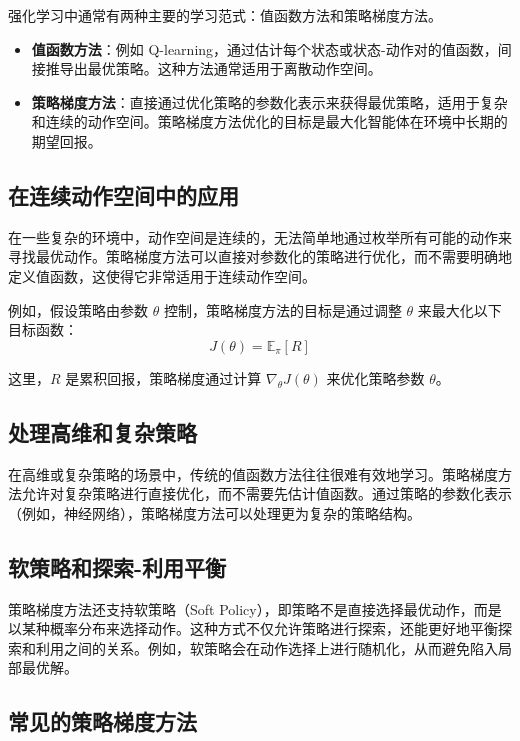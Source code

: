 \documentclass[twocolumn, 10pt]{article} %
\theoremstyle{remark}
\begin{document}
强化学习中通常有两种主要的学习范式：值函数方法和策略梯度方法。

\begin{itemize}
    \item \textbf{值函数方法}：例如 Q-learning，通过估计每个状态或状态-动作对的值函数，间接推导出最优策略。这种方法通常适用于离散动作空间。
    \item \textbf{策略梯度方法}：直接通过优化策略的参数化表示来获得最优策略，适用于复杂和连续的动作空间。策略梯度方法优化的目标是最大化智能体在环境中长期的期望回报。
\end{itemize}

\subsection{在连续动作空间中的应用}

在一些复杂的环境中，动作空间是连续的，无法简单地通过枚举所有可能的动作来寻找最优动作。策略梯度方法可以直接对参数化的策略进行优化，而不需要明确地定义值函数，这使得它非常适用于连续动作空间。

例如，假设策略由参数 \( \theta \) 控制，策略梯度方法的目标是通过调整 \( \theta \) 来最大化以下目标函数：
\[
J(\theta) = \mathbb{E}_\pi \left[ R \right]
\]

这里，\( R \) 是累积回报，策略梯度通过计算 \( \nabla_\theta J(\theta) \) 来优化策略参数 \( \theta \)。

\subsection{处理高维和复杂策略}

在高维或复杂策略的场景中，传统的值函数方法往往很难有效地学习。策略梯度方法允许对复杂策略进行直接优化，而不需要先估计值函数。通过策略的参数化表示（例如，神经网络），策略梯度方法可以处理更为复杂的策略结构。

\subsection{软策略和探索-利用平衡}

策略梯度方法还支持软策略（Soft Policy），即策略不是直接选择最优动作，而是以某种概率分布来选择动作。这种方式不仅允许策略进行探索，还能更好地平衡探索和利用之间的关系。例如，软策略会在动作选择上进行随机化，从而避免陷入局部最优解。

\subsection{常见的策略梯度方法}
\end{document}
